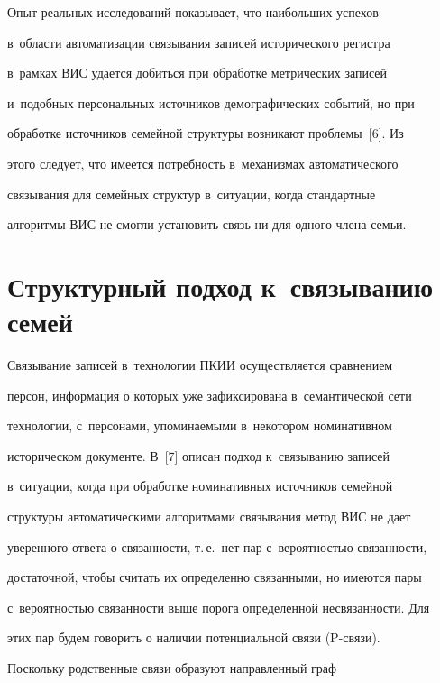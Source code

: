   


  Опыт реальных исследований показывает, что наибольших успехов 


в~об\-ласти автоматизации связывания записей исторического регистра 


в~рамках ВИС удается добиться при обработке метрических записей 


и~подобных персональных источников демографических событий, но при 


обработке источников семейной структуры возникают проблемы~[6]. Из 


этого следует, что имеется потребность в~механизмах автоматического 


связывания для семейных структур в~ситуации, когда стандартные 


алгоритмы ВИС не смогли установить связь ни для одного члена семьи.





\section{Структурный подход к~связыванию семей}





  Связывание записей в~технологии ПКИИ осуществляется сравнением 


персон, информация о которых уже зафиксирована в~семантической сети 


технологии, с~персонами, упоминаемыми в~некотором номинативном 


историческом документе. В~[7] описан подход к~связыванию записей 


в~ситуации, когда при обработке номинативных источников семейной 


структуры автоматическими алгоритмами связывания метод ВИС не дает 


уверенного ответа о связанности, т.\,е.\ нет пар с~вероятностью связанности, 


достаточной, чтобы считать их определенно связанными, но имеются пары 


с~вероятностью связанности выше порога определенной несвязанности. Для 


этих пар будем говорить о наличии потенциальной связи (P-связи). 


  


  Поскольку родственные связи образуют направленный граф 


